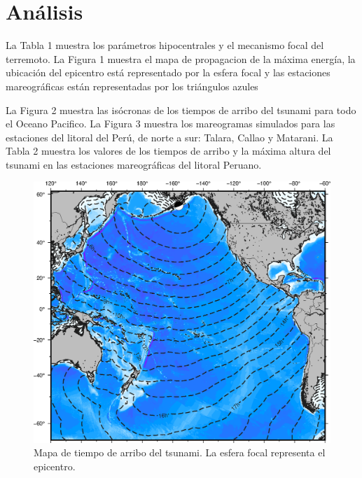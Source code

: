 \documentclass[a4paper,11pt]{article}
\begin{document}
 \section*{Análisis}
 La Tabla 1 muestra los parámetros hipocentrales y el mecanismo focal del 
 terremoto. La Figura 1 muestra el mapa de propagacion de la máxima energía,
 la ubicación del epicentro está representado por la esfera focal y las 
 estaciones mareográficas están representadas por los triángulos azules
  
 La Figura 2 muestra las isócronas de los tiempos de arribo del tsunami para 
 todo el Oceano Pacifico. La Figura 3 muestra los mareogramas simulados para 
 las estaciones del litoral del Perú, de norte a sur: Talara, Callao y 
 Matarani. La Tabla 2 muestra los valores de los tiempos de arribo y la 
 máxima altura del tsunami en las estaciones mareográficas del litoral 
 Peruano.
 \begin{figure}
 \centerline{\includegraphics[scale=0.78]{ttt.eps}}
 \caption{Mapa de tiempo de arribo del tsunami. La esfera focal representa el 
 epicentro.}
 \label{ttt}
 \end{figure}
\end{document}
